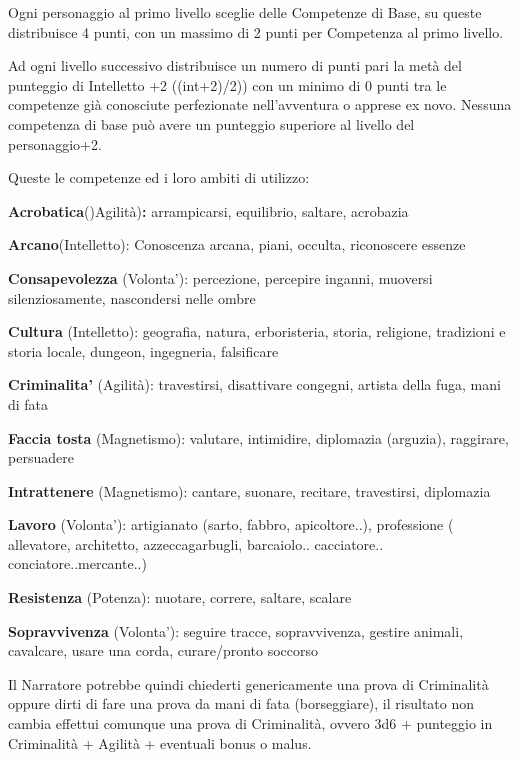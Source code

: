 \documentclass[a4paper,11pt,twoside,openany]{book}
\begin{document}
Ogni personaggio al primo livello sceglie delle Competenze di Base, su queste distribuisce 4 punti, con un massimo di 2 punti per Competenza al primo livello.

Ad ogni livello successivo distribuisce un numero di punti pari la metà del punteggio di Intelletto +2 ((int+2)/2)) con un minimo di 0 punti tra le competenze già conosciute perfezionate nell'avventura o apprese ex novo. Nessuna competenza di base può avere un  punteggio superiore al livello del personaggio+2.

\bigskip

Queste le competenze ed i loro ambiti di utilizzo:

\textbf{Acrobatica}()Agilità)\textbf{:} arrampicarsi, equilibrio, saltare, acrobazia

\textbf{Arcano}(Intelletto): Conoscenza arcana, piani, occulta, riconoscere essenze

\textbf{Consapevolezza} (Volonta'): percezione, percepire inganni, muoversi silenziosamente, nascondersi nelle ombre

\textbf{Cultura} (Intelletto): geografia, natura, erboristeria, storia, religione, tradizioni e storia locale, dungeon, ingegneria, falsificare

\textbf{Criminalita'} (Agilità): travestirsi, disattivare congegni, artista della fuga, mani di fata

\textbf{Faccia tosta} (Magnetismo): valutare, intimidire, diplomazia (arguzia), raggirare, persuadere

\textbf{Intrattenere} (Magnetismo): cantare, suonare, recitare, travestirsi, diplomazia

\textbf{Lavoro} (Volonta'): artigianato (sarto, fabbro, apicoltore..), professione ( allevatore, architetto, azzeccagarbugli, barcaiolo.. cacciatore.. conciatore..mercante..)

\textbf{Resistenza} (Potenza): nuotare, correre, saltare, scalare

\textbf{Sopravvivenza} (Volonta'): seguire tracce, sopravvivenza, gestire animali, cavalcare, usare una corda, curare/pronto soccorso

\bigskip

Il Narratore potrebbe quindi chiederti genericamente una prova di Criminalità oppure dirti di fare una prova da mani di fata (borseggiare), il risultato non cambia effettui comunque una prova di Criminalità, ovvero 3d6 + punteggio in Criminalità + Agilità + eventuali bonus
o malus.
\end{document}
